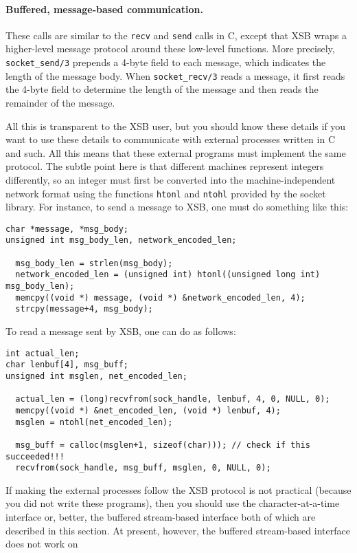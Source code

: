 \paragraph{Buffered, message-based communication.}
These calls are similar to the {\tt recv} and {\tt send} calls in C, except
that XSB wraps a higher-level message protocol around these low-level
functions. More precisely, {\tt socket\_send/3} prepends a 4-byte field
to each message, which indicates the length of the message
body. When {\tt socket\_recv/3} reads a message, it first reads the 4-byte
field to determine the length of the message and then reads the remainder
of the message. 

All this is transparent to the XSB user, but you should know these details
if you want to use these details to communicate with external processes
written in C and such. All this means that these external programs must
implement the same protocol. The subtle point here is that different
machines represent integers differently, so an integer must first be
converted into the machine-independent network format using the functions
{\tt htonl} and {\tt ntohl} provided by the socket library. For instance,
to send a message to XSB, one must do something like this:
\begin{verbatim}
char *message, *msg_body;
unsigned int msg_body_len, network_encoded_len;

  msg_body_len = strlen(msg_body);
  network_encoded_len = (unsigned int) htonl((unsigned long int) msg_body_len);
  memcpy((void *) message, (void *) &network_encoded_len, 4);
  strcpy(message+4, msg_body);
\end{verbatim}
To read a message sent by XSB, one can do as follows:
\begin{verbatim}
int actual_len;
char lenbuf[4], msg_buff;
unsigned int msglen, net_encoded_len;  

  actual_len = (long)recvfrom(sock_handle, lenbuf, 4, 0, NULL, 0);
  memcpy((void *) &net_encoded_len, (void *) lenbuf, 4);
  msglen = ntohl(net_encoded_len);

  msg_buff = calloc(msglen+1, sizeof(char))); // check if this succeeded!!!
  recvfrom(sock_handle, msg_buff, msglen, 0, NULL, 0);
\end{verbatim}
If making the external processes follow the XSB protocol is not practical
(because you did not write these programs), then you should use the
character-at-a-time interface or, better, the buffered
stream-based interface both of which are described in this section.
At present, however, the buffered stream-based interface does not work on

